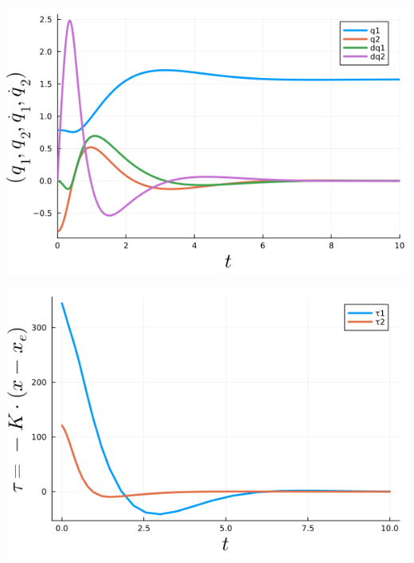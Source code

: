 \begin{center}
    \begin{minipage}{0.45\columnwidth}
        \includegraphics[width=\linewidth]{graphics/Chap09/2LinkManipulatorSimulationClosedLoopStates.png}
    \end{minipage}
    \hfill
    \begin{minipage}{0.45\columnwidth}
        \includegraphics[width=\linewidth]{graphics/Chap09/2LinkManipulatorSimulationClosedLoopStatesControlSignals.png}
    \end{minipage}
\end{center}
 \bigskip

